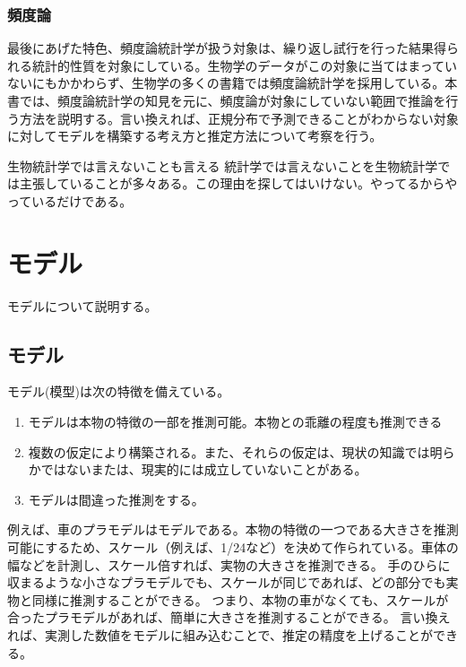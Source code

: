\subsection{頻度論}
最後にあげた特色、頻度論統計学が扱う対象は、繰り返し試行を行った結果得られる統計的性質を対象にしている。生物学のデータがこの対象に当てはまっていないにもかかわらず、生物学の多くの書籍では頻度論統計学を採用している。本書では、頻度論統計学の知見を元に、頻度論が対象にしていない範囲で推論を行う方法を説明する。言い換えれば、正規分布で予測できることがわからない対象に対してモデルを構築する考え方と推定方法について考察を行う。

\begin{SMbox}{生物統計学では言えないことも言える}
    統計学では言えないことを生物統計学では主張していることが多々ある。この理由を探してはいけない。やってるからやっているだけである。

\end{SMbox}

\chapter{モデル}
モデルについて説明する。

\section{モデル}
モデル(模型)は次の特徴を備えている。
\begin{enumerate}
    \item モデルは本物の特徴の一部を推測可能。本物との乖離の程度も推測できる
    \item 複数の仮定により構築される。また、それらの仮定は、現状の知識では明らかではないまたは、現実的には成立していないことがある。
    \item モデルは間違った推測をする。
\end{enumerate}
  
例えば、車のプラモデルはモデルである。本物の特徴の一つである大きさを推測可能にするため、スケール（例えば、1/24など）を決めて作られている。車体の幅などを計測し、スケール倍すれば、実物の大きさを推測できる。
手のひらに収まるような小さなプラモデルでも、スケールが同じであれば、どの部分でも実物と同様に推測することができる。
つまり、本物の車がなくても、スケールが合ったプラモデルがあれば、簡単に大きさを推測することができる。
言い換えれば、実測した数値をモデルに組み込むことで、推定の精度を上げることができる。

